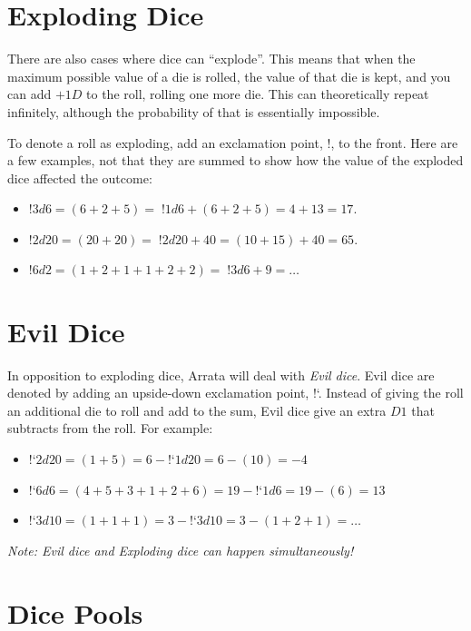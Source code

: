 \documentclass[../main.tex]{subfiles}
\begin{document}
    \section{Exploding Dice}

    There are also cases where dice can ``explode''. This means that when the maximum possible value of a die is rolled, the value of that die is kept, and you can add $+1D$ to the roll, rolling one more die. This can theoretically repeat infinitely, although the probability of that is essentially impossible.

    To denote a roll as exploding, add an exclamation point, $!$, to the front. Here are a few examples, not that they are summed to show how the value of the exploded dice affected the outcome:

    \begin{itemize}
        \item $!3d6 = (6 + 2 + 5) =\; !1d6 + (6 + 2 + 5) = 4 + 13 = 17$.
        \item $!2d20 = (20 + 20) =\; !2d20 + 40 = (10 + 15) + 40 = 65$.
        \item $!6d2 = (1 + 2 + 1 + 1 + 2 + 2) =\; !3d6 + 9 = \dots$
    \end{itemize}

    \section{Evil Dice}

    In opposition to exploding dice, Arrata will deal with {\em Evil dice}. Evil dice are denoted by adding an upside-down exclamation point, !`. Instead of giving the roll an additional die to roll and add to the sum, Evil dice give an extra $D1$ that subtracts from the roll. For example:

    \begin{itemize}
        \item!`$2d20 = (1 + 5) = 6 - $!`$1d20 = 6 - (10) = -4$
        \item!`$6d6 = (4 + 5 + 3 + 1 + 2 + 6) = 19 - $!`$1d6 = 19 - (6) = 13$
        \item!`$3d10 = (1 + 1 + 1) = 3 - $!`$3d10 = 3 - (1 + 2 + 1) = \dots$
    \end{itemize}

    {\em Note: Evil dice and Exploding dice can happen simultaneously!}

    \section{Dice Pools}
\end{document}
